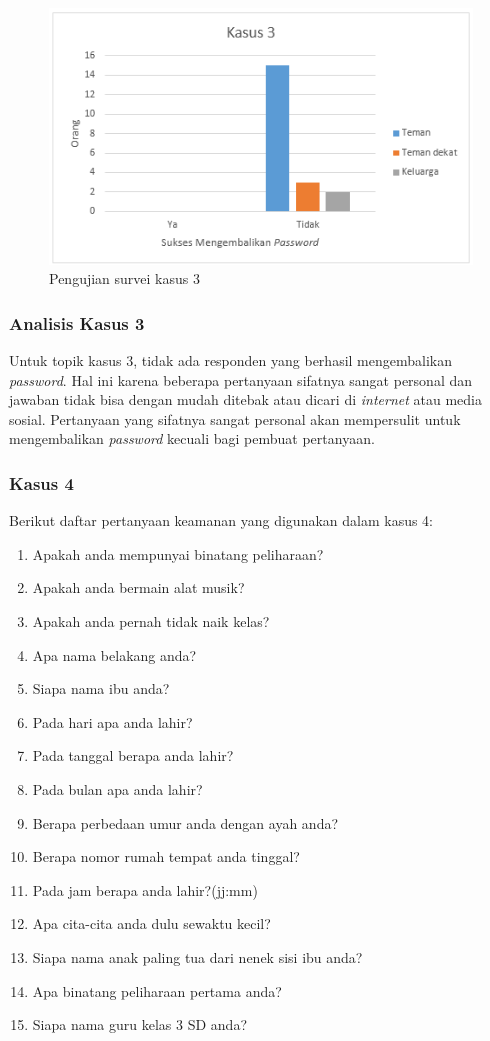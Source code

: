 \begin{figure}[H]
	\includegraphics[scale=0.8]{Gambar/kasus3}
	\centering
	\caption{Pengujian survei kasus 3}\label{fig:kasus3}
\end{figure}

\subsubsection{Analisis Kasus 3}

Untuk topik kasus 3, tidak ada responden yang berhasil mengembalikan \textit{password}. Hal ini karena beberapa pertanyaan sifatnya sangat personal dan jawaban tidak bisa dengan mudah ditebak atau dicari di \textit{internet} atau media sosial. Pertanyaan yang sifatnya sangat personal akan mempersulit untuk mengembalikan \textit{password} kecuali bagi pembuat pertanyaan.

\subsubsection{Kasus 4}

Berikut daftar pertanyaan keamanan yang digunakan dalam kasus 4:

\begin{enumerate}[itemsep=0mm]
	\item Apakah anda mempunyai binatang peliharaan?
	\item Apakah anda bermain alat musik?
	\item Apakah anda pernah tidak naik kelas?
	\item Apa nama belakang anda?
	\item Siapa nama ibu anda?
	\item Pada hari apa anda lahir?
	\item Pada tanggal berapa anda lahir?
	\item Pada bulan apa anda lahir?
	\item Berapa perbedaan umur anda dengan ayah anda?
	\item Berapa nomor rumah tempat anda tinggal?
	\item Pada jam berapa anda lahir?(jj:mm)
	\item Apa cita-cita anda dulu sewaktu kecil?
	\item Siapa nama anak paling tua dari nenek sisi ibu anda?
	\item Apa binatang peliharaan pertama anda?
	\item Siapa nama guru kelas 3 SD anda?
\end{enumerate}

